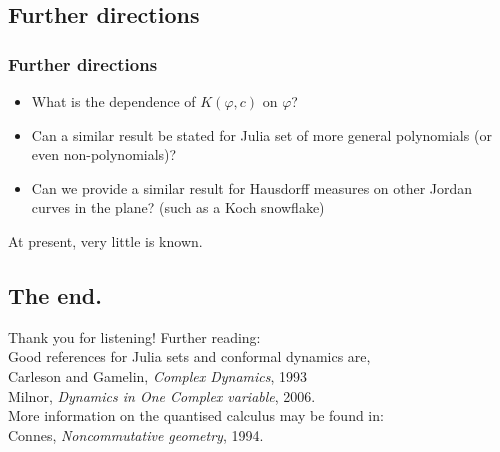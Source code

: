 \documentclass{beamer} %
\theoremstyle{definition} %
\newcommand{\Itgr}{\mathbb{Z}}
\newcommand{\Circ}{\mathbb{T}}
\newcommand{\sgn}{\mathrm{sgn}}
\begin{document}
\subsection{Further directions}
\begin{frame}\frametitle{Further directions}
    \begin{itemize}
        \item{} What is the dependence of $K(\varphi,c)$ on $\varphi$?
        \item{} Can a similar result be stated for Julia set of more general polynomials (or even non-polynomials)?
        \item{} Can we provide a similar result for Hausdorff measures on other Jordan curves in the plane? (such as a Koch snowflake)
    \end{itemize}
    At present, very little is known.
\end{frame}

\subsection{The end.}
\begin{frame}
    Thank you for listening!
%     
%     
    Further reading:\\
    Good references for Julia sets and conformal dynamics are,\\
    Carleson and Gamelin, \emph{ Complex Dynamics}, 1993\\
    Milnor, \emph{Dynamics in One Complex variable}, 2006.\\
    
    More information on the quantised calculus may be found in:\\
    Connes, \emph{Noncommutative geometry}, 1994.
\end{frame}


% 
\end{document}
